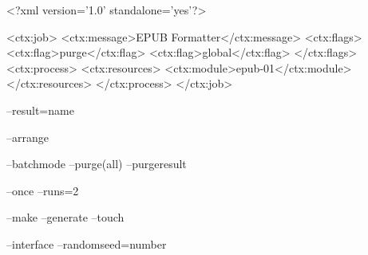 \StopSteps

\page

\StartSteps

\startsubject[title=A ctx file]

\starttyping
<?xml version='1.0' standalone='yes'?>

<ctx:job>
    <ctx:message>EPUB Formatter</ctx:message>
    <ctx:flags>
        <ctx:flag>purge</ctx:flag>
        <ctx:flag>global</ctx:flag>
    </ctx:flags>
    <ctx:process>
        <ctx:resources>
            <ctx:module>epub-01</ctx:module>
        </ctx:resources>
    </ctx:process>
</ctx:job>
\stoptyping \FlushStep

\stopsubject

\StopSteps

\page

\StartSteps

\startsubject[title=Multiple products from one source]

    \starttyping
    --result=name
    \stoptyping \FlushStep

\stopsubject

\startsubject[title=When imposition is needed]

    \starttyping
    --arrange
    \stoptyping \FlushStep

\stopsubject

\startsubject[title=Cleanup after runs]

    \starttyping
    --batchmode
    --purge(all)
    --purgeresult
    \stoptyping \FlushStep

\stopsubject

\StopSteps

\page

\StartSteps

\startsubject[title=Sometimes faster (in services)]

    \starttyping
    --once
    --runs=2
    \stoptyping \FlushStep

\stopsubject

\startsubject[title=Normally automatically done]

    \starttyping
    --make
    --generate
    --touch
    \stoptyping \FlushStep

\stopsubject

\startsubject[title=Seldom used]

    \starttyping
    --interface
    --randomseed=number
    \stoptyping \FlushStep

\stopsubject

\StopSteps

